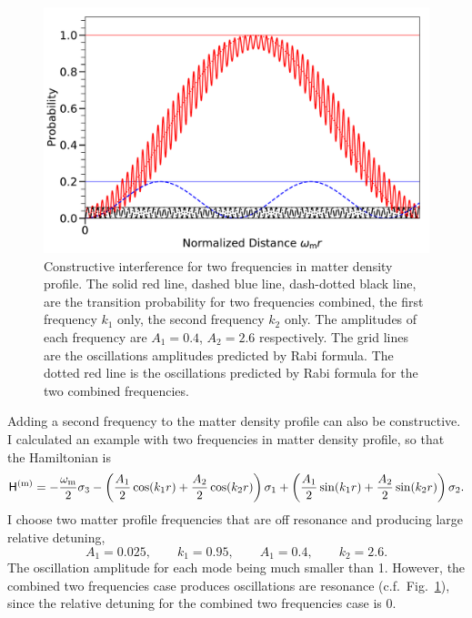 \begin{figure}[!htbp]
    \centering
    \includegraphics[width=\textwidth]{chapters/assets/rabi/rabiOscillationsNeutrinoCoincidence-two-frequencies-constructive.pdf}
    \caption{Constructive interference for two frequencies in matter density profile. The solid red line, dashed blue line, dash-dotted black line, are the transition probability for two frequencies combined, the first frequency $k_1$ only, the second frequency $k_2$ only. The amplitudes of each frequency are $A_1=0.4$, $A_2=2.6$ respectively. The grid lines are the oscillations amplitudes predicted by Rabi formula. The dotted red line is the oscillations predicted by Rabi formula for the two combined frequencies.}
    \label{chap:matter-sec:constructive-fig:two-frequencies-constructive}
\end{figure}

Adding a second frequency to the matter density profile can also be constructive. I calculated an example with two frequencies in matter density profile, so that the Hamiltonian is
\begin{equation*}
    \mathsf H^{(\mathrm m)} = - \frac{\omega_{\mathrm m}}{2} \sigma_3 - \left(\frac{A_1}{2}\cos(k_1 r) + \frac{A_2}{2}\cos(k_2 r) \right) \sigma_1 + \left( \frac{A_1}{2}\sin(k_1 r) + \frac{A_2}{2}\sin(k_2 r) \right) \sigma_2.
\end{equation*}
I choose two matter profile frequencies that are off resonance and producing large relative detuning,
\begin{equation}
    A_1 = 0.025, \qquad k_1 = 0.95, \qquad A_1 = 0.4, \qquad k_2 = 2.6.
\end{equation}
The oscillation amplitude for each mode being much smaller than 1. However, the combined two frequencies case produces oscillations are resonance (c.f.~Fig.~\ref{chap:matter-sec:constructive-fig:two-frequencies-constructive}), since the relative detuning for the combined two frequencies case is 0.



